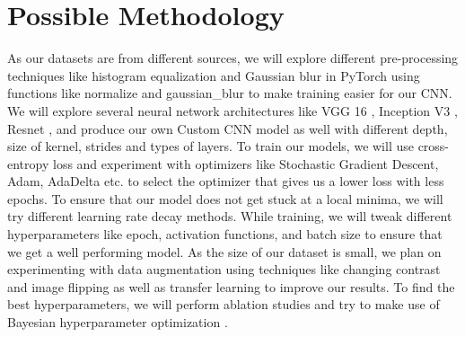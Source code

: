 \documentclass[10pt,twocolumn,letterpaper]{article}
\begin{document}
\section{Possible Methodology}
\label{sec:method}
As our datasets are from different sources, we will explore different 
pre-processing techniques like histogram equalization and Gaussian blur 
\cite{gielczyk2022pre} in PyTorch 
using functions like normalize and gaussian\_blur\cite{transforms} 
to make training easier for our CNN. We will explore several neural network architectures like VGG 16 \cite{simonyan2014very}, 
Inception V3 \cite{szegedy2016rethinking}, Resnet \cite{he2016deep}, and produce our own Custom CNN model as well 
with different depth, size of kernel, strides and types of layers. 
To train our models, we will use cross-entropy loss and experiment 
with optimizers \cite{dloptimizers} like Stochastic Gradient Descent, Adam, AdaDelta \cite{kandel2020comparative} etc. 
to select the optimizer that gives us a lower loss with less epochs. 
To ensure that our model does not get stuck at a local minima, we 
will try different learning rate decay methods. While training, we 
will tweak different hyperparameters like epoch, activation functions, 
and batch size to ensure that we get a well performing model. As 
the size of our dataset is small, we plan on experimenting with 
data augmentation using techniques like changing contrast and image flipping 
as well as transfer learning to improve our results. 
To find the best hyperparameters, we will perform ablation 
studies and try to make use of Bayesian hyperparameter optimization 
\cite{balandat2020botorch}. 
\end{document}
